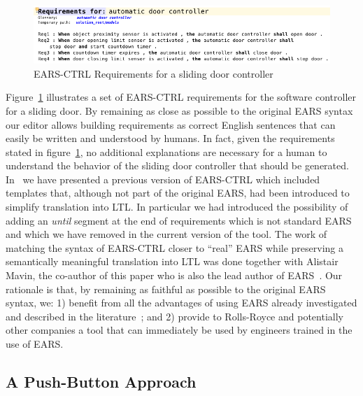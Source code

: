 \vspace{-.5cm} \begin{figure}[h!]
   \begin{center}
     \includegraphics[width=.9\textwidth]{images/EARS-Reqs.png}
     \vspace{-.3cm}
     \caption{\textsf{EARS-CTRL} Requirements for a sliding door
     controller} 
     \label{fig:ears_reqs}
   \end{center} 
 \end{figure}
\vspace{-1cm}Figure~\ref{fig:ears_reqs} illustrates a set of \textsf{EARS-CTRL}
requirements for the software controller for a sliding door. By remaining as close as
possible to the original EARS syntax our editor allows building requirements as
correct English sentences that can easily be written and understood by humans.
In fact, given the requirements stated in figure~\ref{fig:ears_reqs}, no
additional explanations are necessary for a human to understand the behavior of
the sliding door controller that should be generated. In~\cite{LucioRCM17} we
have presented a previous version of \textsf{EARS-CTRL} which included templates
that, although not part of the original EARS, had been introduced to simplify
translation into LTL. In particular we had introduced the possibility of adding
an \emph{until} segment at the end of requirements which is not standard EARS
and which we have removed in the current version of the tool.
The work of matching the syntax of \textsf{EARS-CTRL} closer to ``real'' EARS
while preserving a semantically meaningful translation into LTL was done
together with Alistair Mavin, the co-author of this paper who is also the lead author of EARS~\cite{EARS09}.
Our rationale is that, by remaining as faithful as possible to the original EARS
syntax, we: 1) benefit from all the advantages of using EARS already
investigated and described in the literature~\cite{EARS09,EARS16}; and 2)
provide to Rolls-Royce and potentially other companies a tool that can
immediately be used by engineers trained in the use of EARS.\vspace{-.5cm}

\subsection{A Push-Button Approach}

